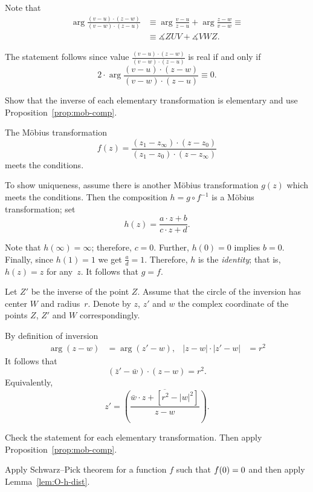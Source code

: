 Note that 
\begin{align*}
\arg\frac{(v-u)\cdot(z-w)}{(v-w)\cdot(z-u)}
&\equiv
\arg\frac{v-u}{z-u}
+
\arg\frac{z-w}{v-w}\equiv
\\
&\equiv \measuredangle ZUV+\measuredangle VWZ.
\end{align*}

The statement follows since value $\tfrac{(v-u)\cdot(z-w)}{(v-w)\cdot(z-u)}$ is real if and only if 
\[2\cdot\arg\frac{(v-u)\cdot(z-w)}{(v-w)\cdot(z-u)}\equiv0.\]


Show that the inverse of each elementary transformation is elementary
and use Proposition~\ref{prop:mob-comp}.

The M\"obius transformation
\[f(z)=\frac{(z_1-z_\infty)\cdot(z-z_0)}{(z_1-z_0)\cdot(z-z_\infty)}\]
meets the conditions.

To show uniqueness, assume there is another M\"obius transformation
$g(z)$ which meets the conditions.
Then the composition
$h=g\circ f^{-1}$ 
is a M\"obius transformation; set
$$h(z)=\frac{a\cdot z+b}{c\cdot z+d}.$$ 

Note that $h(\infty)=\infty$;
therefore, $c=0$.
Further, $h(0)=0$ implies $b=0$.
Finally, since $h(1)=1$ we get $\tfrac ad=1$.
Therefore, $h$ is the \emph{identity};
that is, $h(z)=z$ for any~$z$.
It follows that $g=f$.

Let $Z'$ be the inverse of the point $Z$.
Assume that the circle of the inversion has center $W$ and radius~$r$.
Denote by $z$, $z'$ and $w$ the complex coordinate of the points $Z$, $Z'$ and $W$ correspondingly.

By definition of inversion  
\begin{align*}
\arg (z-w)&=\arg (z'-w),
&
|z-w|\cdot|z'-w|&=r^2
\end{align*}
It follows that
\[(\bar z'-\bar w)\cdot ( z- w)= r^2.\]
Equivalently,
\[z'=\overline{\left(\frac{\bar w\cdot  z+[r^2-|w|^2]}{z-  w}\right)}.\]

 
Check the statement for each elementary transformation.
Then apply Proposition~\ref{prop:mob-comp}.

Apply Schwarz--Pick theorem for a function $f$ such that $f(0)\z=0$ and then apply Lemma~\ref{lem:O-h-dist}.

